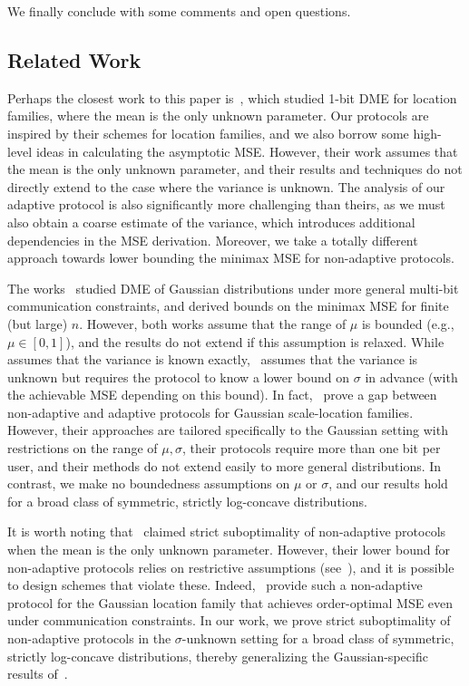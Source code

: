 \documentclass[10pt]{article} %
\theoremstyle{plain}
\theoremstyle{definition}
\theoremstyle{remark}
\begin{document}
\par We finally conclude with some comments and open questions.



\subsection{Related Work}

Perhaps the closest work to this paper is~\citep{kipnis2022mean}, which studied 1-bit DME for location families, where the mean is the only unknown parameter. Our protocols are inspired by their schemes for location families, and we also borrow some high-level ideas in calculating the asymptotic MSE. However, their work assumes that the mean is the only unknown parameter, and their results and techniques do not directly extend to the case where the variance is unknown. The analysis of our adaptive protocol is also significantly more challenging than theirs, as we must also obtain a coarse estimate of the variance, which introduces additional dependencies in the MSE derivation. Moreover, we take a totally different approach towards lower bounding the minimax MSE for non-adaptive protocols.  

The works~\citep{cai2022adaptive,cai2024distributed} studied DME of Gaussian distributions under more general multi-bit communication constraints, and derived bounds on the minimax MSE for finite (but large) $n$. However, both works assume that the range of $\mu$ is bounded (e.g., $\mu \in [0,1]$), and the results do not extend if this assumption is relaxed. While~\citep{cai2024distributed} assumes that the variance is known exactly,~\citep{cai2022adaptive} assumes that the variance is unknown but requires the protocol to know a lower bound on $\sigma$ in advance (with the achievable MSE depending on this bound). In fact,~\citep{cai2022adaptive} prove a gap between non-adaptive and adaptive protocols for Gaussian scale-location families. However, their approaches are tailored specifically to the Gaussian setting with restrictions on the range of $\mu,\sigma$, their protocols require more than one bit per user, and their methods do not extend easily to more general distributions. In contrast, we make no boundedness assumptions on $\mu$ or $\sigma$, and our results hold for a broad class of symmetric, strictly log-concave distributions.

It is worth noting that~\citep{kipnis2022mean} claimed strict suboptimality of non-adaptive protocols when the mean is the only unknown parameter. However, their lower bound for non-adaptive protocols relies on restrictive assumptions (see~\cite[Assumption A2]{kipnis2022mean}), and it is possible to design schemes that violate these. Indeed,~\citep{cai2024distributed} provide such a non-adaptive protocol for the Gaussian location family that achieves order-optimal MSE even under communication constraints. In our work, we prove strict suboptimality of non-adaptive protocols in the $\sigma$-unknown setting for a broad class of symmetric, strictly log-concave distributions, thereby generalizing the Gaussian-specific results of~\citep{cai2022adaptive}.
\end{document}
